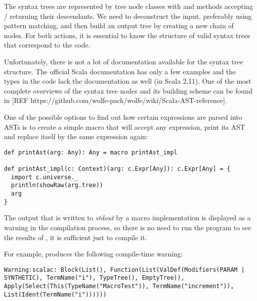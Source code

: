 The syntax trees are represented by tree node classes with  and  methods accepting / returning their descendants. We need to deconstruct the input, preferably using pattern matching, and then build an output tree by creating a new chain of nodes. For both actions, it is essential to know the structure of valid syntax trees that correspond to the code.

Unfortunately, there is not a lot of documentation available for the syntax tree structure. The official Scala documentation has only a few examples and the types in the code lack the documentation as well (in Scala 2.11). One of the most complete overviews of the syntax tree nodes and its building scheme can be found in [REF https://github.com/wolfe-pack/wolfe/wiki/Scala-AST-reference].


One of the possible options to find out how certain expressions are parsed into ASTs is to create a simple macro that will accept any expression, print its AST and replace itself by the same expression again:

\lstset{style=Scala}
\begin{lstlisting}
def printAst(arg: Any): Any = macro printAst_impl

def printAst_impl(c: Context)(arg: c.Expr[Any]): c.Expr[Any] = {
  import c.universe._
  println(showRaw(arg.tree))
  arg
}
\end{lstlisting}

The output that is written to \textit{stdout} by a macro implementation is displayed as a warning in the compilation process, so there is no need to run the program to see the results of , it is sufficient just to compile it.

For example,  produces the following compile-time warning:

\lstset{style=Dump}
\begin{lstlisting}
Warning:scalac: Block(List(), Function(List(ValDef(Modifiers(PARAM | SYNTHETIC), TermName("i"), TypeTree(), EmptyTree)), Apply(Select(This(TypeName("MacroTest")), TermName("increment")), List(Ident(TermName("i"))))))
\end{lstlisting}


